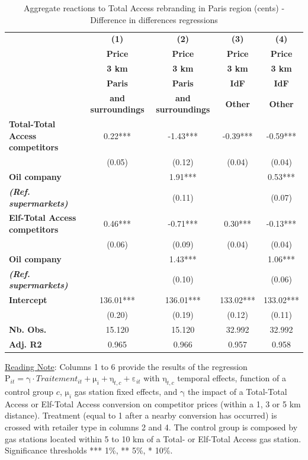 \documentclass[english]{article}
\begin{document}
\begin{table}[H]
\caption{Aggregate reactions to Total Access rebranding in Paris region (cents) - Difference in differences regressions}
\label{tab:paris_comp_reaction_dd_regs}
\begin{threeparttable}
\begin{footnotesize}
\begin{tabular}{l|cccc}
\hline
\hline
 & \textbf{(1)}  & \textbf{(2)}  & \textbf{(3)}  & \textbf{(4) }\tabularnewline
 & \textbf{Price}  & \textbf{Price}  & \textbf{Price}  & \textbf{Price}\tabularnewline
 & \textbf{3 km}  & \textbf{3 km}  & \textbf{3 km}  & \textbf{3 km}\tabularnewline
\hline
 & \textbf{Paris}  & \textbf{Paris}  & \textbf{IdF}  & \textbf{IdF}\tabularnewline
 & \textbf{and surroundings}  & \textbf{and surroundings}  & \textbf{Other}  & \textbf{Other}\tabularnewline
\hline
\textbf{Total-Total Access competitors}  & 0.22{*}{*}{*}  & -1.43{*}{*}{*}  & -0.39{*}{*}{*}  & -0.59{*}{*}{*}\tabularnewline
 & (0.05)  & (0.12)  & (0.04)  & (0.04)\tabularnewline
\textbf{Oil company}  &  & 1.91{*}{*}{*}  &  & 0.53{*}{*}{*}\tabularnewline
\textbf{\textit{(Ref. supermarkets)}}  &  & (0.11)  &  & (0.07)\tabularnewline
\hline
\textbf{Elf-Total Access competitors}  & 0.46{*}{*}{*}  & -0.71{*}{*}{*}  & 0.30{*}{*}{*}  & -0.13{*}{*}{*}\tabularnewline
 & (0.06)  & (0.09)  & (0.04)  & (0.04)\tabularnewline
\textbf{Oil company}  &  & 1.43{*}{*}{*}  &  & 1.06{*}{*}{*}\tabularnewline
\textbf{\textit{(Ref. supermarkets)}}  &  & (0.10)  &  & (0.06)\tabularnewline
\hline
\textbf{Intercept}  & 136.01{*}{*}{*}  & 136.01{*}{*}{*}  & 133.02{*}{*}{*}  & 133.02{*}{*}{*}\tabularnewline
 & (0.20)  & (0.19)  & (0.12)  & (0.11)\tabularnewline
\hline
\textbf{Nb. Obs.}  & 15.120  & 15.120  & 32.992  & 32.992\tabularnewline
\textbf{Adj. R2}  & 0.965  & 0.966  & 0.957  & 0.958\tabularnewline
\hline
\hline
\end{tabular}
\end{footnotesize}
\end{threeparttable}
\end{table}

{\small{}\uline{Reading Note}}{\small{}: } Columns 1 to 6 provide the results of the regression $\mathrm{P}_{it}=\mathrm{\gamma}\cdot Traitement_{it}+\mathrm{\mu}_{i}+\mathrm{\eta}_{t,c}+\mathrm{\varepsilon}_{it}$
with $\mathrm{\eta}_{t,c}$ temporal effects, function of a control group $c$, $\mathrm{\mu}_{i}$ gas station fixed effects, and $\mathrm{\gamma}$ the impact of a Total-Total Access or Elf-Total Access conversion on competitor prices (within a 1, 3 or 5 km distance). Treatment (equal to 1 after a nearby conversion has occurred) is crossed with retailer type in columns 2 and 4. The control group is composed by gas stations located within 5 to 10 km of a Total- or Elf-Total Access gas station. Significance thresholds {*}{*}{*} 1\%, {*}{*} 5\%, {*} 10\%.\medskip{}
\end{document}

